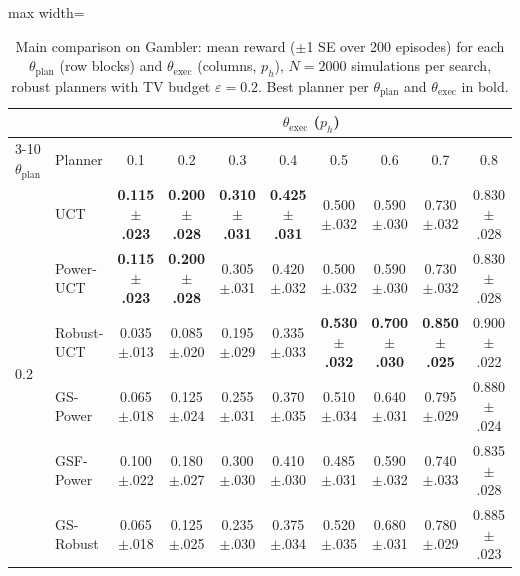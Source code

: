 \begin{table}
\centering
\small
\caption{Main comparison on Gambler: mean reward ($\pm$1 SE over 200 episodes) for each $\theta_{\text{plan}}$ (row blocks) and $\theta_{\text{exec}}$ (columns, $p_h$), $N = 2000$ simulations per search, robust planners with TV budget $\varepsilon = 0.2$. Best planner per $\theta_{\text{plan}}$ and $\theta_{\text{exec}}$ in bold.}
\label{tab:main-gambler}
\begin{adjustbox}{max width=\linewidth}
\begin{tabular}{llcccccccc}
\toprule
 & & \multicolumn{8}{c}{$\theta_{\text{exec}}$ ($p_h$)} \\
\cmidrule(l){3-10}
$\theta_{\text{plan}}$ & Planner & 0.1 & 0.2 & 0.3 & 0.4 & 0.5 & 0.6 & 0.7 & 0.8 \\
\midrule
\multirow{7}{*}{0.2} & UCT & \textbf{0.115{\scriptsize$\pm$.023}} & \textbf{0.200{\scriptsize$\pm$.028}} & \textbf{0.310{\scriptsize$\pm$.031}} & \textbf{0.425{\scriptsize$\pm$.031}} & 0.500{\scriptsize$\pm$.032} & 0.590{\scriptsize$\pm$.030} & 0.730{\scriptsize$\pm$.032} & 0.830{\scriptsize$\pm$.028} \\
 & Power-UCT & \textbf{0.115{\scriptsize$\pm$.023}} & \textbf{0.200{\scriptsize$\pm$.028}} & 0.305{\scriptsize$\pm$.031} & 0.420{\scriptsize$\pm$.032} & 0.500{\scriptsize$\pm$.032} & 0.590{\scriptsize$\pm$.030} & 0.730{\scriptsize$\pm$.032} & 0.830{\scriptsize$\pm$.028} \\
 & Robust-UCT & 0.035{\scriptsize$\pm$.013} & 0.085{\scriptsize$\pm$.020} & 0.195{\scriptsize$\pm$.029} & 0.335{\scriptsize$\pm$.033} & \textbf{0.530{\scriptsize$\pm$.032}} & \textbf{0.700{\scriptsize$\pm$.030}} & \textbf{0.850{\scriptsize$\pm$.025}} & 0.900{\scriptsize$\pm$.022} \\
 & GS-Power & 0.065{\scriptsize$\pm$.018} & 0.125{\scriptsize$\pm$.024} & 0.255{\scriptsize$\pm$.031} & 0.370{\scriptsize$\pm$.035} & 0.510{\scriptsize$\pm$.034} & 0.640{\scriptsize$\pm$.031} & 0.795{\scriptsize$\pm$.029} & 0.880{\scriptsize$\pm$.024} \\
 & GSF-Power & 0.100{\scriptsize$\pm$.022} & 0.180{\scriptsize$\pm$.027} & 0.300{\scriptsize$\pm$.030} & 0.410{\scriptsize$\pm$.030} & 0.485{\scriptsize$\pm$.031} & 0.590{\scriptsize$\pm$.032} & 0.740{\scriptsize$\pm$.033} & 0.835{\scriptsize$\pm$.028} \\
 & GS-Robust & 0.065{\scriptsize$\pm$.018} & 0.125{\scriptsize$\pm$.025} & 0.235{\scriptsize$\pm$.030} & 0.375{\scriptsize$\pm$.034} & 0.520{\scriptsize$\pm$.035} & 0.680{\scriptsize$\pm$.031} & 0.780{\scriptsize$\pm$.029} & 0.885{\scriptsize$\pm$.023} \\

\end{tabular}
\end{adjustbox}
\end{table}
